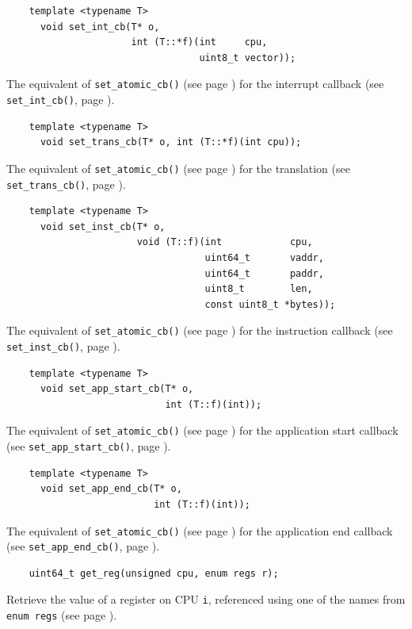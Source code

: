 \documentclass[letterpaper, 10pt]{book}
\begin{document}
\label{tf:set_int_cb} \begin{verbatim}
    template <typename T>
      void set_int_cb(T* o,
                      int (T::*f)(int     cpu, 
                                  uint8_t vector));
\end{verbatim}
The equivalent of \texttt{set\_atomic\_cb()} (see page
\pageref{tf:set_atomic_cb}) for the interrupt callback (see 
\texttt{set\_int\_cb()}, page \pageref{func:set_int_cb}).

\label{tf:set_int_cb} \begin{verbatim}
    template <typename T>
      void set_trans_cb(T* o, int (T::*f)(int cpu));
\end{verbatim}
The equivalent of \texttt{set\_atomic\_cb()} (see page
\pageref{tf:set_atomic_cb}) for the translation (see
\texttt{set\_trans\_cb()}, page \pageref{func:set_trans_cb}).

\label{tf:set_inst_cb} \begin{verbatim}
    template <typename T>
      void set_inst_cb(T* o,
                       void (T::f)(int            cpu,
                                   uint64_t       vaddr,
                                   uint64_t       paddr,
                                   uint8_t        len,
                                   const uint8_t *bytes));
\end{verbatim}
The equivalent of \texttt{set\_atomic\_cb()} (see page
\pageref{tf:set_atomic_cb}) for the instruction callback (see 
\texttt{set\_inst\_cb()}, page \pageref{func:set_inst_cb}).

\label{tf:set_app_start_cb} \begin{verbatim}
    template <typename T>
      void set_app_start_cb(T* o,
                            int (T::f)(int));
\end{verbatim}
The equivalent of \texttt{set\_atomic\_cb()} (see page
\pageref{tf:set_atomic_cb}) for the application start callback (see
\texttt{set\_app\_start\_cb()}, page \pageref{func:set_app_start_cb}).

\label{tf:set_app_end_cb} \begin{verbatim}
    template <typename T>
      void set_app_end_cb(T* o,
                          int (T::f)(int));
\end{verbatim}
The equivalent of \texttt{set\_atomic\_cb()} (see page 
\pageref{tf:set_atomic_cb}) for the application end callback (see 
\texttt{set\_app\_end\_cb()}, page \pageref{func:set_app_end_cb}).

\label{func:get_reg} \begin{verbatim}
    uint64_t get_reg(unsigned cpu, enum regs r);
\end{verbatim}
Retrieve the value of a register on CPU \texttt{i}, referenced using one of the
names from \texttt{enum regs} (see page \pageref{enum:regs}).
\end{document}
